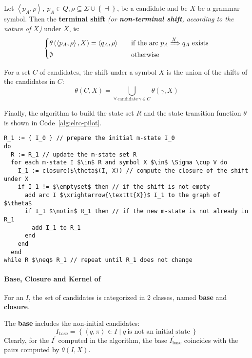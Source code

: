 \documentclass[english]{article}
\begin{document}
Let \(\left\langle p_A, \rho \right\rangle, \ p_A \in Q, \rho \subseteq \Sigma \cup \left\{ \dashv \right\}\), be a candidate and be \(X\) be a grammar symbol.
Then the \textbf{terminal shift} \textit{(or \textbf{non-terminal shift}, according to the nature of \(X\))} under \(X\), is:
\[\begin{cases}
    \theta \left( \left\langle p_A, \rho \right\rangle, X \right) = \left\langle q_A, \rho \right\rangle \quad & \text{if the arc} \ p_A \xRightarrow{X} q_A \ \text{exists} \\
    \emptyset \quad                                                                                            & \text{otherwise}
  \end{cases}\]

For a set \(C\) of candidates, the shift under a symbol \(X\) is the union of the shifts of the candidates in \(C\):
\[ \theta(C, X) = \bigcup_{\forall \, \text{candidate} \, \gamma \in C} \theta(\gamma, X) \]

Finally, the algorithm to build the state set \(R\) and the state transition function \(\theta\) is shown in Code~\ref{alg:elro-pilot}.

\begin{lstlisting}[caption={Algorithm to build the \ELRo pilot automaton}, label={alg:elro-pilot}]
R_1 := { I_0 } // prepare the initial m-state I_0
do
  R := R_1 // update the m-state set R
  for each m-state I $\in$ R and symbol X $\in$ \Sigma \cup V do
    I_1 := closure($\theta$(I, X)) // compute the closure of the shift under X
    if I_1 != $\emptyset$ then // if the shift is not empty
      add arc I $\xrightarrow{\texttt{X}}$ I_1 to the graph of $\theta$
      if I_1 $\notin$ R_1 then // if the new m-state is not already in R_1
        add I_1 to R_1
      end
    end
  end
while R $\neq$ R_1 // repeat until R_1 does not change
\end{lstlisting}

\paragraph[Base, Closure and Kernel of m-state]{Base, Closure and Kernel of \mstate}
\label{par:base-closure-kernel}

For an \mstate \(I\), the set of candidates is categorized in \(2\) classes, named \textbf{base} and \textbf{closure}.

The \textbf{base} includes the non-initial candidates:
\[ I_{\text{base}} = \left\{ \left\langle q, \pi \right\rangle \in I \mid q \ \text{is not an initial state} \ \right\} \]
Clearly, for the \mstate \(I^\prime\) computed in the algorithm, the base \(I^\prime_{\text{base}}\) coincides with the pairs computed by \(\theta(I, X)\).
\end{document}
